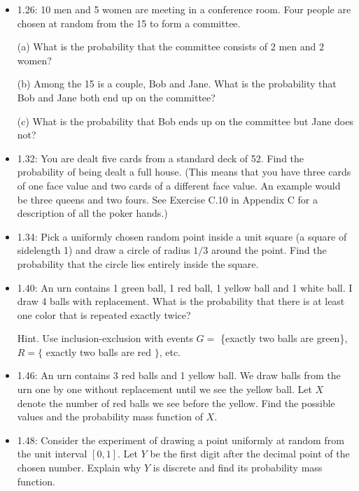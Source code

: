 \documentclass[10pt]{article}
\begin{document}
\begin{itemize}
(b) Give an example of an event in this probability space with probability $\frac{3}{52}$.

(c) Show that there is no event in this probability space with probability $\frac{1}{5}$.

\item 1.26: 10 men and 5 women are meeting in a conference room. Four people are chosen at random from the 15 to form a committee.

(a) What is the probability that the committee consists of 2 men and 2 women?

(b) Among the 15 is a couple, Bob and Jane. What is the probability that Bob and Jane both end up on the committee?

(c) What is the probability that Bob ends up on the committee but Jane does not?

\item 1.32: You are dealt five cards from a standard deck of 52. Find the probability of being dealt a full house. (This means that you have three cards of one face value and two cards of a different face value. An example would be three queens and two fours. See Exercise C.10 in Appendix C for a description of all the poker hands.)

\item 1.34: Pick a uniformly chosen random point inside a unit square (a square of sidelength 1) and draw a circle of radius $1 / 3$ around the point. Find the probability that the circle lies entirely inside the square.

\item 1.40: An urn contains 1 green ball, 1 red ball, 1 yellow ball and 1 white ball. I draw 4 balls with replacement. What is the probability that there is at least one color that is repeated exactly twice?

Hint. Use inclusion-exclusion with events $G=$ \{exactly two balls are green\}, $R=\{$ exactly two balls are red $\}$, etc.

\item 1.46: An urn contains 3 red balls and 1 yellow ball. We draw balls from the urn one by one without replacement until we see the yellow ball. Let $X$ denote the number of red balls we see before the yellow. Find the possible values and the probability mass function of $X$.

\item 1.48: Consider the experiment of drawing a point uniformly at random from the unit interval $[0,1]$. Let $Y$ be the first digit after the decimal point of the chosen number. Explain why $Y$ is discrete and find its probability mass function.

\end{itemize}
\end{document}
